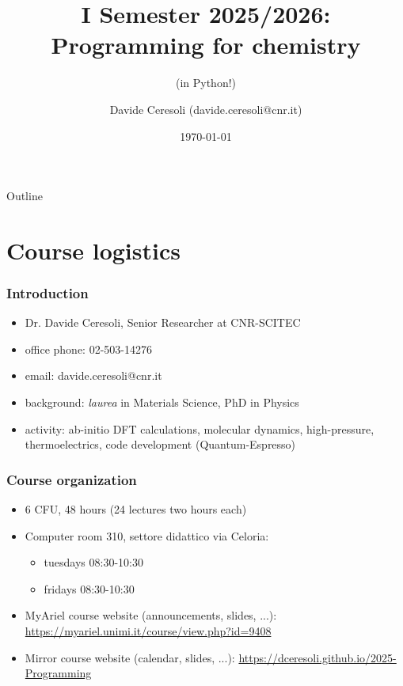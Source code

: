 \documentclass[handout]{beamer}
\title[Prog4Chem]{I Semester 2025/2026: Programming for chemistry}
\subtitle{(in Python!)}
\author[Davide Ceresoli]{Davide Ceresoli (davide.ceresoli@cnr.it)}
\date{\today}
\institute[CNR-SCITEC]{Instituto di Scienze e Tecnologie Chimiche ``G. Natta'' (CNR-SCITEC)}
\begin{document}
\begin{frame}
\titlepage
\end{frame}

\begin{frame}{Outline}
\tableofcontents
\end{frame}



\section{Course logistics}
\begin{frame}[fragile]
  \frametitle{Introduction}
  \begin{itemize}
  \item Dr. Davide Ceresoli, Senior Researcher at CNR-SCITEC
  \item office phone: 02-503-14276
  \item email: davide.ceresoli@cnr.it 
  \item background: \emph{laurea} in Materials Science, PhD in Physics
  \item activity: ab-initio DFT calculations, molecular dynamics, high-pressure, thermoelectrics, code development (Quantum-Espresso)  
  \end{itemize}
\end{frame}

\begin{frame}[fragile]
  \frametitle{Course organization}
  \begin{itemize}
  \item 6 CFU, 48 hours (24 lectures two hours each)
  \item Computer room 310, settore didattico via Celoria:
        \begin{itemize}
        \item tuesdays 08:30-10:30
        \item fridays 08:30-10:30
        \end{itemize}
  \item MyAriel course website (announcements, slides, ...): \url{https://myariel.unimi.it/course/view.php?id=9408}
  \item Mirror course website (calendar, slides, ...): \url{https://dceresoli.github.io/2025-Programming}
  \end{itemize}
\end{frame}
\end{document}
